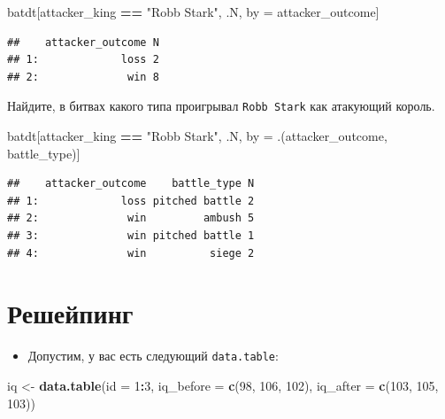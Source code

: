 \documentclass[]{book}
\newenvironment{Shaded}{\begin{snugshade}}{\end{snugshade}}
\newcommand{\KeywordTok}[1]{\textcolor[rgb]{0.13,0.29,0.53}{\textbf{#1}}}
\newcommand{\DataTypeTok}[1]{\textcolor[rgb]{0.13,0.29,0.53}{#1}}
\newcommand{\DecValTok}[1]{\textcolor[rgb]{0.00,0.00,0.81}{#1}}
\newcommand{\StringTok}[1]{\textcolor[rgb]{0.31,0.60,0.02}{#1}}
\newcommand{\OperatorTok}[1]{\textcolor[rgb]{0.81,0.36,0.00}{\textbf{#1}}}
\newcommand{\NormalTok}[1]{#1}
\providecommand{\tightlist}{%
  \setlength{\itemsep}{0pt}\setlength{\parskip}{0pt}}
\begin{document}
\begin{Shaded}
\begin{Highlighting}[]
\NormalTok{batdt[attacker_king }\OperatorTok{==}\StringTok{ "Robb Stark"}\NormalTok{, .N, by =}\StringTok{ }\NormalTok{attacker_outcome]}
\end{Highlighting}
\end{Shaded}

\begin{verbatim}
##    attacker_outcome N
## 1:             loss 2
## 2:              win 8
\end{verbatim}

Найдите, в битвах какого типа проигрывал \texttt{Robb\ Stark} как
атакующий король.

\begin{Shaded}
\begin{Highlighting}[]
\NormalTok{batdt[attacker_king }\OperatorTok{==}\StringTok{ "Robb Stark"}\NormalTok{, .N, by =}\StringTok{ }\NormalTok{.(attacker_outcome, battle_type)]}
\end{Highlighting}
\end{Shaded}

\begin{verbatim}
##    attacker_outcome    battle_type N
## 1:             loss pitched battle 2
## 2:              win         ambush 5
## 3:              win pitched battle 1
## 4:              win          siege 2
\end{verbatim}

\section{Решейпинг}\label{solvtask_reshape}

\begin{itemize}
\tightlist
\item
  Допустим, у вас есть следующий \texttt{data.table}:
\end{itemize}

\begin{Shaded}
\begin{Highlighting}[]
\NormalTok{iq <-}\StringTok{ }\KeywordTok{data.table}\NormalTok{(}\DataTypeTok{id =} \DecValTok{1}\OperatorTok{:}\DecValTok{3}\NormalTok{, }\DataTypeTok{iq_before =} \KeywordTok{c}\NormalTok{(}\DecValTok{98}\NormalTok{, }\DecValTok{106}\NormalTok{, }\DecValTok{102}\NormalTok{), }\DataTypeTok{iq_after =} \KeywordTok{c}\NormalTok{(}\DecValTok{103}\NormalTok{, }\DecValTok{105}\NormalTok{, }\DecValTok{103}\NormalTok{))}
\end{Highlighting}
\end{Shaded}
\end{document}
